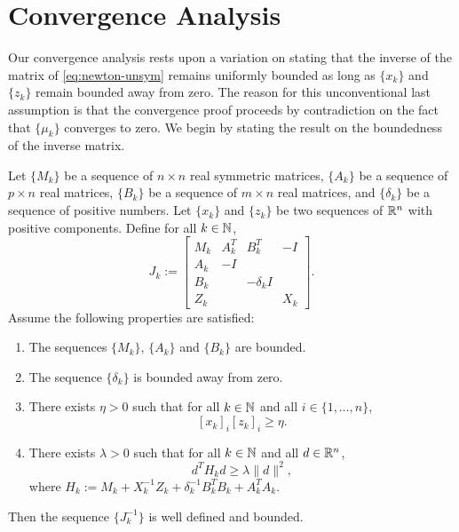 \documentclass{amsart}
\begin{document}
\section{Convergence Analysis}

Our convergence analysis rests upon a variation on
\cite[Theorem~$1$]{armand-benoist-2011} stating that the inverse of the
 matrix of \eqref{eq:newton-unsym} remains uniformly bounded as long
as $\{x_k\}$ and $\{z_k\}$ remain bounded away from zero. The reason for this
unconventional last assumption is that the convergence proof proceeds by
contradiction on the fact that $\{\mu_k\}$ converges to zero. We begin by
stating the result on the boundedness of the inverse  matrix.

\begin{btheorem}
  \label{thm:inv-bounded}
  Let $\{M_k\}$ be a sequence of $n \times n$ real symmetric matrices,
  $\{A_k\}$ be a sequence of $p \times n$ real matrices, $\{B_k\}$ be a
  sequence of $m \times n$ real matrices, and $\{\delta_k\}$ be a sequence of
  positive numbers. Let $\{x_k\}$ and $\{z_k\}$ be two sequences of $\mathbb{R}^n$ with
  positive components. Define for all $k \in \mathbb{N}$,
  \[
    J_k :=
    \begin{bmatrix}
      M_k & A_k^T & B_k^T       & -I \\
      A_k & -I    &             & \\
      B_k &       & -\delta_k I & \\
      Z_k &       &             & X_k
    \end{bmatrix}.
  \]
  Assume the following properties are satisfied:
  \begin{enumerate}
    \item \label{item:bounded}
      The sequences $\{M_k\}$, $\{A_k\}$ and $\{B_k\}$ are bounded.
    \item \label{item:delta}
      The sequence $\{\delta_k\}$ is bounded away from zero.
    \item \label{item:mu}
      There exists $\eta > 0$ such that for all $k \in \mathbb{N}$ and all $i
      \in \{1, \ldots, n\}$,
      \begin{equation}
        \label{eq:contradiction}
        [x_k]_i [z_k]_i \geq \eta.
      \end{equation}
    \item \label{item:convex}
      There exists $\lambda > 0$ such that for all $k \in \mathbb{N}$ and all $d
      \in \mathbb{R}^n$,
      \[
        d^T H_k d \geq \lambda \|d\|^2,
      \]
      where $H_k := M_k + X_k^{-1} Z_k + \delta_k^{-1} B_k^T B_k + A_k^T A_k$.
  \end{enumerate}
  Then the sequence $\{J_k^{-1}\}$ is well defined and bounded.
\end{btheorem}
\end{document}
